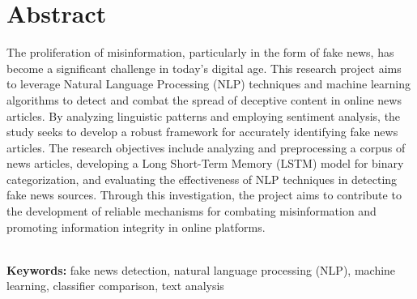 \chapter*{\center \Large  Abstract}

The proliferation of misinformation, particularly in the form of fake news, has become a significant challenge in today's digital age. This research project aims to leverage Natural Language Processing (NLP) techniques and machine learning algorithms to detect and combat the spread of deceptive content in online news articles. By analyzing linguistic patterns and employing sentiment analysis, the study seeks to develop a robust framework for accurately identifying fake news articles. The research objectives include analyzing and preprocessing a corpus of news articles, developing a Long Short-Term Memory (LSTM) model for binary categorization, and evaluating the effectiveness of NLP techniques in detecting fake news sources. Through this investigation, the project aims to contribute to the development of reliable mechanisms for combating misinformation and promoting information integrity in online platforms. 


~\\[1cm]
\noindent %
\textbf{Keywords:} fake news detection, natural language processing (NLP), machine learning, classifier comparison, text analysis 

\vfill
\noindent


